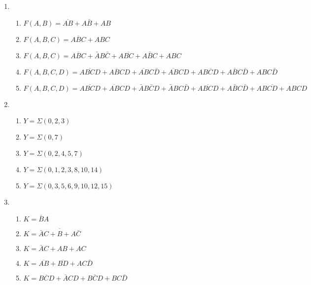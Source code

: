 \documentclass[12pt]{book}
\title{\coursetitle\linebreak\lecturename}
\author{\\Cain Susko\\ 
           \\ \\ \\
      Queen's University 
    \\School of Computing\\}
\begin{document}
\begin{titlepage}
        \maketitle
\end{titlepage}

\Large

\begin{enumerate}
    \item \begin{enumerate}
            \item $F(A,B) = \overline{AB} + A\bar B + AB$
            \item $F(A,B,C) = \overline{ABC} + ABC$
            \item $F(A,B,C) = \overline{ABC} + \bar AB\bar C + A\overline{BC} + A\bar BC + ABC$
            \item $F(A,B,C,D) = \overline{ABCD} + \overline{ABC}D + \overline{AB}C\bar D + \overline{AB}CD + A\overline{BCD} + A\bar BC\bar D + ABC\bar D$
            \item $F(A,B,C,D) = \overline{ABCD} + \overline{AB}CD + \bar AB\bar CD + \bar ABC\bar D + A\overline{BC}D + A\bar B C\bar D + AB\overline{CD} + ABCD$
        \end{enumerate}

   \item \begin{enumerate}
            \item $Y = \Sigma(0,2,3)$ 
            \item $Y = \Sigma(0,7)$ 
            \item $Y = \Sigma(0,2,4,5,7)$ 
            \item $Y = \Sigma(0,1,2,3,8,10,14)$ 
            \item $Y = \Sigma(0,3,5,6,9,10,12,15)$ 
        \end{enumerate} 

   \item \begin{enumerate}
           \item $K = \bar BA$
           \item $K = \overline{\bar AC + B + A\bar C}$
           \item $K = \bar AC + AB + AC$
           \item $K = \overline{AB} + \overline{BD} + AC\bar D$
           \item $K = \overline{BCD} + \bar ACD + B\bar CD + BC \bar D$
        \end{enumerate}
\end{enumerate}
\end{document}
